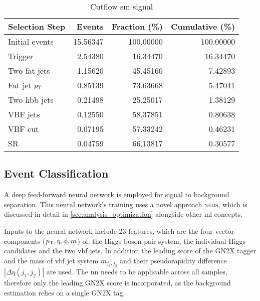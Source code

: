 \begin{table}[htbp]
    \centering
    \caption{Cutflow \ac{sm} signal}
    \begin{tabular}{lrrr}
        \hline
        \textbf{Selection Step} & \textbf{Events} & \textbf{Fraction (\%)} & \textbf{Cumulative (\%)} \\ \hline
        Initial events          & 15.56347        & 100.00000              & 100.00000                \\\hline
        Trigger                 & 2.54380         & 16.34470               & 16.34470                 \\
        Two fat jets            & 1.15620         & 45.45160               & 7.42893                  \\
        Fat jet $p_{\text{T}}$           & 0.85139         & 73.63668               & 5.47041                  \\
        Two hbb jets            & 0.21498         & 25.25017               & 1.38129                  \\
        VBF jets                & 0.12550         & 58.37851               & 0.80638                  \\
        VBF cut                 & 0.07195         & 57.33242               & 0.46231                  \\
        SR                      & 0.04759         & 66.13817               & 0.30577                  \\\hline
    \end{tabular}
\end{table}









\subsection{Event Classification}\label{sec:event_classification}
A deep feed-forward neural network is employed for signal to background separation. This neural network's training uses a novel approach \textsc{neos}, which is discussed in detail in \ref{sec:analysis_optimization} alongside other \ac{ml} concepts.

Inputs to the neural network include 23 features, which are the four vector components ($p_{\text{T}},\eta,\phi,m$) of: the Higgs boson pair system, the individual Higgs candidates and the two \ac{vbf} jets. In addition the leading score of the GN2X tagger and the mass of \ac{vbf} jet system $m_{j_1,j_2}$ and their pseudorapidity difference $|\Delta\eta(j_1,j_2)|$ are used. The \ac{nn} needs to be applicable across all samples, therefore only the leading GN2X score is incorporated, as the background estimation relies on a single GN2X tag.

